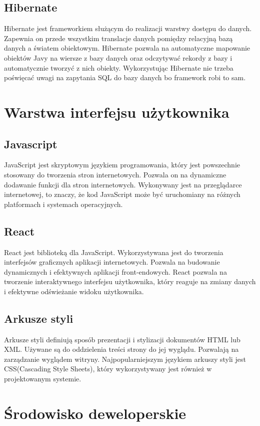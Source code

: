 \subsection{Hibernate}
\label{hibernate:label}
Hibernate jest frameworkiem służącym do realizacji warstwy dostępu do danych. Zapewnia on przede wszystkim translacje danych pomiędzy relacyjną bazą danych a światem obiektowym. Hibernate pozwala na automatyczne mapowanie obiektów Javy na wiersze z bazy danych oraz odczytywać rekordy z bazy i automatycznie tworzyć z nich obiekty. Wykorzystując Hibernate nie trzeba poświęcać uwagi na zapytania SQL do bazy danych bo framework robi to sam.


\section{Warstwa interfejsu użytkownika}
\subsection{Javascript}
JavaScript jest skryptowym językiem programowania, który jest powszechnie stosowany do tworzenia stron internetowych. Pozwala on na dynamiczne dodawanie funkcji dla stron internetowych. Wykonywany jest na przeglądarce internetowej, to znaczy, że kod JavaScript może być uruchomiany na różnych platformach i systemach operacyjnych. 

\subsection{React}
React jest biblioteką dla JavaScript. Wykorzystywana jest do tworzenia interfejsów graficznych aplikacji internetowych. Pozwala na budowanie dynamicznych i efektywnych aplikacji front-endowych. React pozwala na tworzenie interaktywnego interfejsu użytkownika, który reaguje na zmiany danych i efektywne odświeżanie widoku użytkownika.

\subsection{Arkusze styli}
Arkusze styli definiują sposób prezentacji i stylizacji dokumentów HTML lub XML. Używane są do oddzielenia treści strony do jej wyglądu. Pozwalają na zarządzanie wyglądem witryny. Najpopularniejszym językiem arkuszy styli jest CSS(Cascading Style Sheets), który wykorzystywany jest również w projektowanym systemie.
\section{Środowisko deweloperskie}
